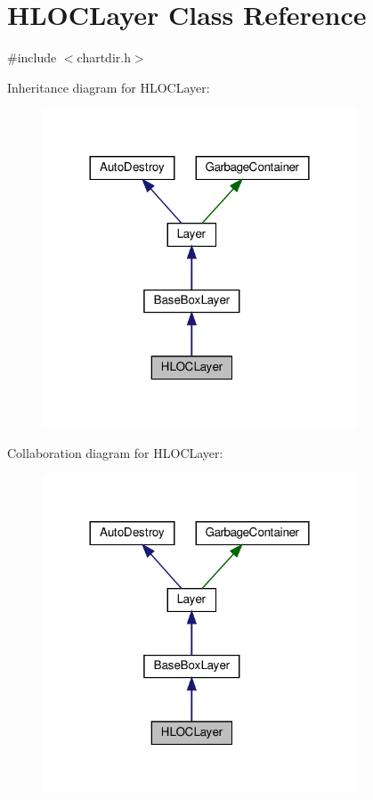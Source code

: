 \hypertarget{class_h_l_o_c_layer}{}\section{H\+L\+O\+C\+Layer Class Reference}
\label{class_h_l_o_c_layer}


{\ttfamily \#include $<$chartdir.\+h$>$}



Inheritance diagram for H\+L\+O\+C\+Layer\+:
\nopagebreak
\begin{figure}[H]
\begin{center}
\leavevmode
\includegraphics[width=264pt]{class_h_l_o_c_layer__inherit__graph}
\end{center}
\end{figure}


Collaboration diagram for H\+L\+O\+C\+Layer\+:
\nopagebreak
\begin{figure}[H]
\begin{center}
\leavevmode
\includegraphics[width=264pt]{class_h_l_o_c_layer__coll__graph}
\end{center}
\end{figure}
